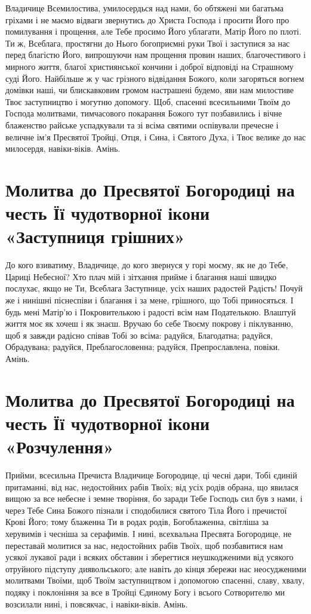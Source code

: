 \documentclass[chapters.tex]{subfiles}
\begin{document}
Владичице Всемилостива, умилосердься над нами, бо обтяжені ми багатьма гріхами і не маємо відваги звернутись до Христа Господа і просити Його про помилування і прощення, але Тебе просимо Його ублагати, Матір Його по плоті. Ти ж, Всеблага, простягни до Нього богоприємні руки Твої і заступися за нас перед благістю Його, випрошуючи нам прощення провин наших, благочестивого і мирного життя, благої християнської кончини і доброї відповіді на Страшному суді Його. Найбільше ж у час грізного відвідання Божого, коли загоряться вогнем домівки наші, чи блискавковим громом настрашені будемо, яви нам милостиве Твоє заступництво і могутню допомогу. Щоб, спасенні всесильними Твоїм до Господа молитвами, тимчасового покарання Божого тут позбавились і вічне блаженство райське успадкували та зі всіма святими оспівували пречесне і величне ім’я Пресвятої Тройці, Отця, і Сина, і Святого Духа, і Твоє велике до нас милосердя, навіки-віків. Амінь.

\section{Молитва до Пресвятої Богородиці на честь Її чудотворної ікони «Заступниця грішних»}
До кого взиватиму, Владичице, до кого звернуся у горі моєму, як не до Тебе, Цариці Небесної? Хто плач мій і зітхання прийме і благання наші швидко послухає, якщо не Ти, Всеблага Заступнице, усіх наших радостей Радість! Почуй же і нинішні піснеспіви і благання і за мене, грішного, що Тобі приносяться. І будь мені Матір’ю і Покровителькою і радості всім нам Подателькою. Влаштуй життя моє як хочеш і як знаєш. Вручаю бо себе Твоєму покрову і піклуванню, щоб я завжди радісно співав Тобі зо всіма: радуйся, Благодатна; радуйся, Обрадувана; радуйся, Преблагословенна; радуйся, Препрославлена, повіки. Амінь.

\section{Молитва до Пресвятої Богородиці на честь Її чудотворної ікони «Розчулення»}
Прийми, всесильна Пречиста Владичице Богородице, ці чесні дари, Тобі єдиній притаманні, від нас, недостойних рабів Твоїх; від усіх родів обрана, що явилася вищою за все небесне і земне творіння, бо заради Тебе Господь сил був з нами, і через Тебе Сина Божого пізнали і сподобилися святого Тіла Його і пречистої Крові Його; тому блаженна Ти в родах родів, Богоблаженна, світліша за херувимів і чесніша за серафимів. І нині, всехвальна Пресвята Богородице, не переставай молитися за нас, недостойних рабів Твоїх, щоб позбавитися нам усякої лукавої ради і всяких обставин і зберегтися неушкодженими від усякого отруйного підступу диявольського; але навіть до кінця збережи нас неосудженими молитвами Твоїми, щоб Твоїм заступництвом і допомогою спасенні, славу, хвалу, подяку і поклоніння за все в Тройці Єдиному Богу і всього Сотворителю ми возсилали нині, і повсякчас, і навіки-віків. Амінь.
\end{document}
